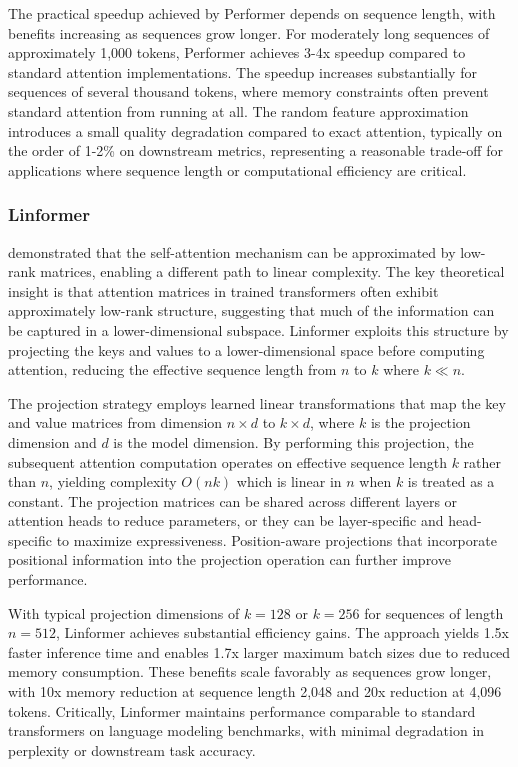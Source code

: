 The practical speedup achieved by Performer depends on sequence length, with benefits increasing as sequences grow longer. For moderately long sequences of approximately 1,000 tokens, Performer achieves 3-4x speedup compared to standard attention implementations. The speedup increases substantially for sequences of several thousand tokens, where memory constraints often prevent standard attention from running at all. The random feature approximation introduces a small quality degradation compared to exact attention, typically on the order of 1-2\% on downstream metrics, representing a reasonable trade-off for applications where sequence length or computational efficiency are critical.

\subsubsection{Linformer}

\citet{wang2020linformer} demonstrated that the self-attention mechanism can be approximated by low-rank matrices, enabling a different path to linear complexity. The key theoretical insight is that attention matrices in trained transformers often exhibit approximately low-rank structure, suggesting that much of the information can be captured in a lower-dimensional subspace. Linformer exploits this structure by projecting the keys and values to a lower-dimensional space before computing attention, reducing the effective sequence length from $n$ to $k$ where $k \ll n$.

The projection strategy employs learned linear transformations that map the key and value matrices from dimension $n \times d$ to $k \times d$, where $k$ is the projection dimension and $d$ is the model dimension. By performing this projection, the subsequent attention computation operates on effective sequence length $k$ rather than $n$, yielding complexity $O(nk)$ which is linear in $n$ when $k$ is treated as a constant. The projection matrices can be shared across different layers or attention heads to reduce parameters, or they can be layer-specific and head-specific to maximize expressiveness. Position-aware projections that incorporate positional information into the projection operation can further improve performance.

With typical projection dimensions of $k=128$ or $k=256$ for sequences of length $n=512$, Linformer achieves substantial efficiency gains. The approach yields 1.5x faster inference time and enables 1.7x larger maximum batch sizes due to reduced memory consumption. These benefits scale favorably as sequences grow longer, with 10x memory reduction at sequence length 2,048 and 20x reduction at 4,096 tokens. Critically, Linformer maintains performance comparable to standard transformers on language modeling benchmarks, with minimal degradation in perplexity or downstream task accuracy.

